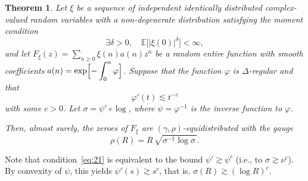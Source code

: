 \documentclass[11pt]{amsart}
\numberwithin{equation}{section}
\newtheorem{theorem}{Theorem}
\newcommand{\bE}{\mathbb E}
\begin{document}
\begin{theorem}\label{thm:IID}
Let $\xi$ be a sequence of independent identically distributed complex-valued random
variables with a non-degenerate distribution satisfying the moment condition
\begin{equation}\label{eq:IID1}
\exists\delta>0, \quad \bE\bigl[ |\xi(0)|^\delta \bigr] < \infty,
\end{equation}
and let $F_\xi(z)=\displaystyle \sum_{n\ge 0} \xi(n) a(n) z^n$
be a random entire function with smooth coefficients
$a(n) = \displaystyle \exp\Bigl[ -\int_0^n \varphi \Bigr]$.
Suppose that the function $\varphi$ is $\Delta$-regular
and that
\begin{equation}\label{eq:21}
\varphi'(t) \lesssim t^{-c}
\end{equation}
with some $c>0$. Let $\sigma = \psi'\circ\log$, where $\psi=\varphi^{-1}$
is the inverse function to $\varphi$.

Then, almost surely, the zeroes of $F_\xi$ are
$(\gamma, \rho)$-equidistributed with the gauge
\begin{equation}\label{eq:IID2}
\rho(R) = R\, \sqrt{\sigma^{-1}\log\sigma\,}.
\end{equation}
\end{theorem}

Note that condition~\eqref{eq:21} is equivalent to the bound $\psi' \gtrsim \psi^c$ (i.e.,
to $\sigma \gtrsim \nu^c$). By convexity of $\psi$, this yields $\psi'(s) \gtrsim s^c$, that is,
$\sigma (R) \gtrsim (\log R)^c$. 
\end{document}
